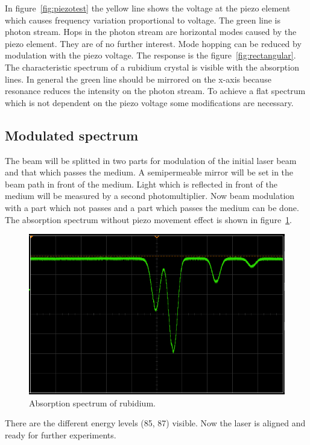 In figure~\ref{fig:piezotest} the yellow line shows the voltage at the piezo
element which causes frequency variation proportional to voltage.
The green line is photon stream. 
Hops in the photon stream are horizontal modes caused by the piezo element.
They are of no further interest.
Mode hopping can be reduced by modulation with the piezo voltage. 
The response is the figure~\ref{fig:rectangular}.
The characteristic spectrum of a rubidium crystal is visible with the
absorption lines. 
In general the green line should be mirrored on the x-axis because resonance
reduces the intensity on the photon stream. 
To achieve a flat spectrum which is not dependent on the piezo voltage some
modifications are necessary.

\subsection{Modulated spectrum}%
\label{sub:modulated_spectrum}

The beam will be splitted in two parts
for modulation of the initial laser beam and that which passes the medium.
A semipermeable mirror will be set in the beam path in front of the medium. 
Light which is reflected in front of the medium will be measured by a second photomultiplier.
Now beam modulation with a part which not passes and a part which passes the
medium can be done. 
The absorption spectrum without piezo movement effect is shown in figure~\ref{fig:modulation}.
\begin{figure}[h]
		\centering
		\includegraphics[width=0.8\linewidth]{./content/pictures/scope_140.png}
		\caption{Absorption spectrum of rubidium.}%
		\label{fig:modulation}
\end{figure}
There are the different energy levels (85, 87) visible.
Now the laser is aligned and ready for further experiments.

